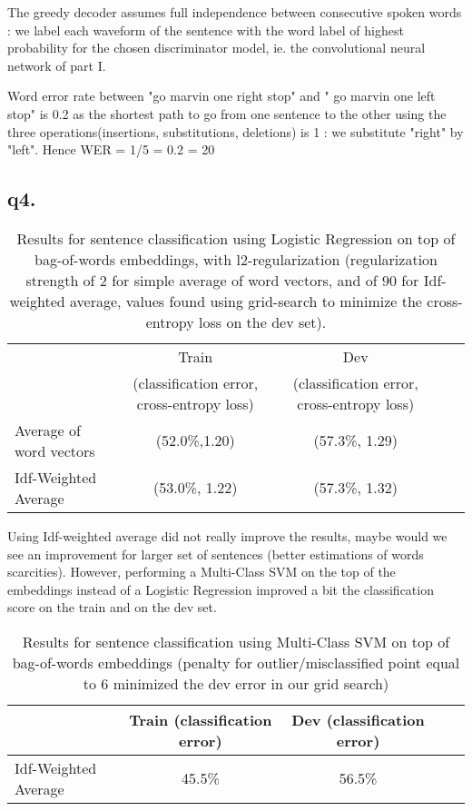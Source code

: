 \documentclass[11pt]{article}
\begin{document}
The greedy decoder assumes full independence between consecutive spoken words : we label each waveform of the sentence with the word label of highest probability for the chosen discriminator model, ie. the convolutional neural network of part I.

Word error rate between "go marvin one right stop" and " go marvin one left stop" is 0.2 as the shortest path to go from one sentence to the other using the three operations(insertions, substitutions, deletions) is 1 : we substitute "right" by "left". Hence WER = 1/5 = 0.2 = 20%

 
  \subsection{q4.}
  
  


\begin{table}[h!]
\centering
  \begin{tabular}{|l|c|c|c|c|}  \hline
        &  Train  & Dev \\  
        
        & (classification error, cross-entropy loss) & (classification error, cross-entropy loss) \\  \hline    
    Average of word vectors & (52.0\%,1.20) & (57.3\%, 1.29) \\ \hline
    Idf-Weighted Average & (53.0\%, 1.22)  & (57.3\%, 1.32) \\ \hline
  \end{tabular}
  \caption{Results for sentence classification using Logistic Regression on top of bag-of-words embeddings, with l2-regularization (regularization strength of $2$ for simple average of word vectors, and of $90$ for Idf-weighted average, values found using grid-search to minimize the cross-entropy loss on the dev set).}
\end{table}

Using Idf-weighted average did not really improve the results, maybe would we see an improvement for larger set of sentences (better estimations of words scarcities).
However, performing a  Multi-Class SVM on the top of the embeddings instead of a Logistic Regression improved a bit the classification score on the train and on the dev set.

\begin{table}[h!]
\centering
  \begin{tabular}{|l|c|c|c|c|}  \hline
        &  Train (classification error) & Dev (classification error) \\    \hline    
    Idf-Weighted Average & 45.5\%  & 56.5\% \\    \hline   
  \end{tabular}
  \caption{Results for sentence classification using Multi-Class SVM on top of bag-of-words embeddings (penalty for outlier/misclassified point equal to $6$ minimized the dev error in our grid search)}
\end{table}
\end{document}
